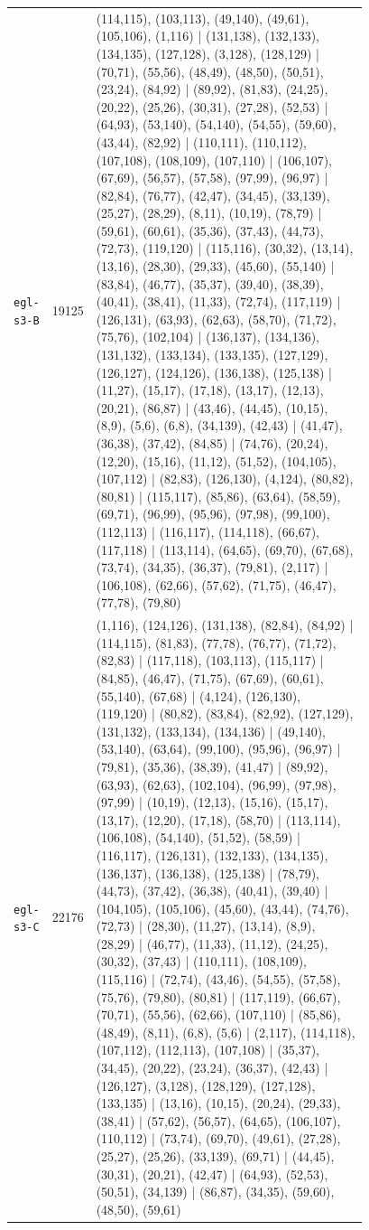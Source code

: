 \begin{landscape}
\begin{longtable}{lr>{\tiny\raggedright\arraybackslash}p{0.78\linewidth}}
\texttt{egl-s3-B} & 19125 & (114,115), (103,113), (49,140), (49,61), (105,106), (1,116) | (131,138), (132,133), (134,135), (127,128), (3,128), (128,129) | (70,71), (55,56), (48,49), (48,50), (50,51), (23,24), (84,92) | (89,92), (81,83), (24,25), (20,22), (25,26), (30,31), (27,28), (52,53) | (64,93), (53,140), (54,140), (54,55), (59,60), (43,44), (82,92) | (110,111), (110,112), (107,108), (108,109), (107,110) | (106,107), (67,69), (56,57), (57,58), (97,99), (96,97) | (82,84), (76,77), (42,47), (34,45), (33,139), (25,27), (28,29), (8,11), (10,19), (78,79) | (59,61), (60,61), (35,36), (37,43), (44,73), (72,73), (119,120) | (115,116), (30,32), (13,14), (13,16), (28,30), (29,33), (45,60), (55,140) | (83,84), (46,77), (35,37), (39,40), (38,39), (40,41), (38,41), (11,33), (72,74), (117,119) | (126,131), (63,93), (62,63), (58,70), (71,72), (75,76), (102,104) | (136,137), (134,136), (131,132), (133,134), (133,135), (127,129), (126,127), (124,126), (136,138), (125,138) | (11,27), (15,17), (17,18), (13,17), (12,13), (20,21), (86,87) | (43,46), (44,45), (10,15), (8,9), (5,6), (6,8), (34,139), (42,43) | (41,47), (36,38), (37,42), (84,85) | (74,76), (20,24), (12,20), (15,16), (11,12), (51,52), (104,105), (107,112) | (82,83), (126,130), (4,124), (80,82), (80,81) | (115,117), (85,86), (63,64), (58,59), (69,71), (96,99), (95,96), (97,98), (99,100), (112,113) | (116,117), (114,118), (66,67), (117,118) | (113,114), (64,65), (69,70), (67,68), (73,74), (34,35), (36,37), (79,81), (2,117) | (106,108), (62,66), (57,62), (71,75), (46,47), (77,78), (79,80) \\[2pt]
\texttt{egl-s3-C} & 22176 & (1,116), (124,126), (131,138), (82,84), (84,92) | (114,115), (81,83), (77,78), (76,77), (71,72), (82,83) | (117,118), (103,113), (115,117) | (84,85), (46,47), (71,75), (67,69), (60,61), (55,140), (67,68) | (4,124), (126,130), (119,120) | (80,82), (83,84), (82,92), (127,129), (131,132), (133,134), (134,136) | (49,140), (53,140), (63,64), (99,100), (95,96), (96,97) | (79,81), (35,36), (38,39), (41,47) | (89,92), (63,93), (62,63), (102,104), (96,99), (97,98), (97,99) | (10,19), (12,13), (15,16), (15,17), (13,17), (12,20), (17,18), (58,70) | (113,114), (106,108), (54,140), (51,52), (58,59) | (116,117), (126,131), (132,133), (134,135), (136,137), (136,138), (125,138) | (78,79), (44,73), (37,42), (36,38), (40,41), (39,40) | (104,105), (105,106), (45,60), (43,44), (74,76), (72,73) | (28,30), (11,27), (13,14), (8,9), (28,29) | (46,77), (11,33), (11,12), (24,25), (30,32), (37,43) | (110,111), (108,109), (115,116) | (72,74), (43,46), (54,55), (57,58), (75,76), (79,80), (80,81) | (117,119), (66,67), (70,71), (55,56), (62,66), (107,110) | (85,86), (48,49), (8,11), (6,8), (5,6) | (2,117), (114,118), (107,112), (112,113), (107,108) | (35,37), (34,45), (20,22), (23,24), (36,37), (42,43) | (126,127), (3,128), (128,129), (127,128), (133,135) | (13,16), (10,15), (20,24), (29,33), (38,41) | (57,62), (56,57), (64,65), (106,107), (110,112) | (73,74), (69,70), (49,61), (27,28), (25,27), (25,26), (33,139), (69,71) | (44,45), (30,31), (20,21), (42,47) | (64,93), (52,53), (50,51), (34,139) | (86,87), (34,35), (59,60), (48,50), (59,61) \\[2pt]

\end{longtable}
\end{landscape}
